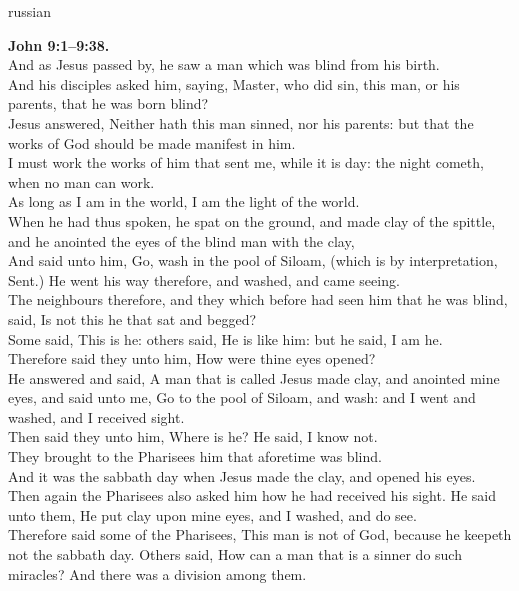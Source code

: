 \documentclass[10pt]{article} %
\begin{document}
{\begin{minipage}[t]{0.48\textwidth}
\begin{otherlanguage*}{russian}
\end{otherlanguage*}
\end{minipage}
\hfill
\begin{minipage}[t]{0.49\textwidth}
\fontsize{8}{9.6}\selectfont
\textbf{John 9:1--9:38.}\\
And as Jesus passed by, he saw a man which was blind from his birth.\\
And his disciples asked him, saying, Master, who did sin, this man, or his parents, that he was born blind?\\
Jesus answered, Neither hath this man sinned, nor his parents: but that the works of God should be made manifest in him.\\
I must work the works of him that sent me, while it is day: the night cometh, when no man can work.\\
As long as I am in the world, I am the light of the world.\\
When he had thus spoken, he spat on the ground, and made clay of the spittle, and he anointed the eyes of the blind man with the clay,\\
And said unto him, Go, wash in the pool of Siloam, (which is by interpretation, Sent.) He went his way therefore, and washed, and came seeing.\\
The neighbours therefore, and they which before had seen him that he was blind, said, Is not this he that sat and begged?\\
Some said, This is he: others said, He is like him: but he said, I am he.\\
Therefore said they unto him, How were thine eyes opened?\\
He answered and said, A man that is called Jesus made clay, and anointed mine eyes, and said unto me, Go to the pool of Siloam, and wash: and I went and washed, and I received sight.\\
Then said they unto him, Where is he? He said, I know not.\\
They brought to the Pharisees him that aforetime was blind.\\
And it was the sabbath day when Jesus made the clay, and opened his eyes.\\
Then again the Pharisees also asked him how he had received his sight. He said unto them, He put clay upon mine eyes, and I washed, and do see.\\
Therefore said some of the Pharisees, This man is not of God, because he keepeth not the sabbath day. Others said, How can a man that is a sinner do such miracles? And there was a division among them.\\

\end{minipage}}
\end{document}
